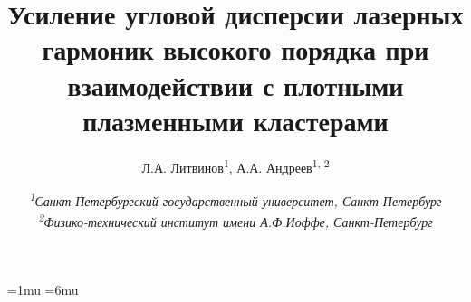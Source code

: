 \documentclass[10pt]{article}
\begin{document}



	\pagestyle{fancy}
	\fancyhf{}
	\fancyhead[L]{\textit{\nouppercase{\leftmark}}}
	\fancyfoot[C]{\thepage}

	\thinmuskip=1mu
	\thickmuskip=6mu
	\def\stacktype{S}\Sstackgap=-4.3pt
	\captionsetup[subfigure]{margin=0.05\textwidth}


	\newcommand{\subfigureautorefname}{\figureautorefname}
	\renewcommand{\thesubfigure}{\asbuk{subfigure}}


	\title{Усиление угловой дисперсии лазерных гармоник высокого порядка при взаимодействии с плотными плазменными кластерами}
	\author{
		Л.А. Литвинов\textsuperscript{1}, А.А. Андреев\textsuperscript{1, 2}
	}
	\date{
		\normalsize{\textit{\textsuperscript{1}Санкт-Петербургский государственный университет, Санкт-Петербург \\ \textsuperscript{2}Физико-технический институт имени А.Ф.Иоффе, Санкт-Петербург}}
	}
	\maketitle

	
	
	
	
	
	
	
	

	\clearpage
	
	
\end{document}
